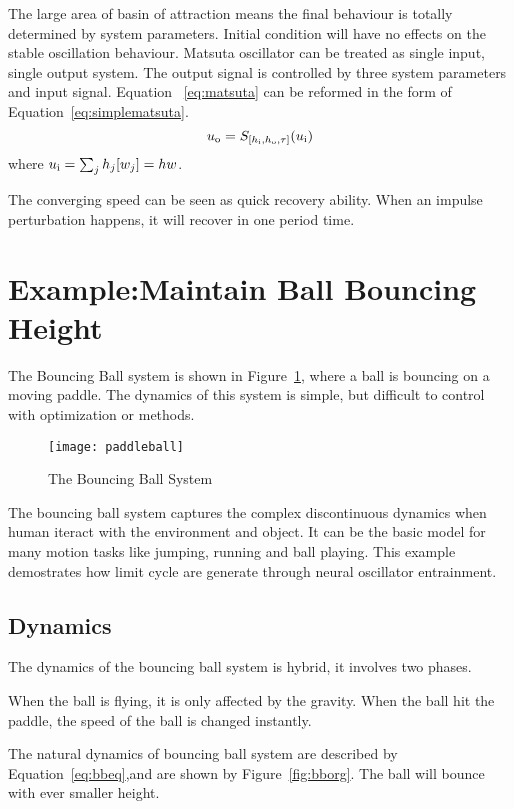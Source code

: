 The large area of basin of attraction means the final behaviour is totally determined by system parameters. 
Initial condition will have no effects on the stable oscillation behaviour. 
Matsuta oscillator can be treated as single input, single output system.
The output signal is controlled by three system parameters and input signal. 
Equation ~\ref{eq:matsuta} can be reformed in the form of Equation~\ref{eq:simplematsuta}.
\begin{equation}
\label{eq:simplematsuta}
u_{\mathrm{o}}=S_{[h_{\mathrm{i}},h_{\mathrm{o}},\tau]}(u_{\mathrm{i}})
\end{equation}
where $u_{\mathrm{i}}=\sum_{j}h_{j}[w_{j}]=hw$.





The converging speed can be seen as quick recovery ability.
When an impulse perturbation happens, it will recover in one period time.


\section{Example:Maintain Ball Bouncing Height}
\label{sec:qualyexample}
The Bouncing Ball system is shown in Figure~\ref{fig:bball}, where a ball is bouncing on a moving paddle.
The dynamics of this system is simple, but difficult to control with optimization or \pd methods.
\begin{figure}
\begin{center}
\texttt{[image: paddleball]}
\end{center}
\caption{The Bouncing Ball System}
\label{fig:bball}
\end{figure}
 
The bouncing ball system captures the complex discontinuous dynamics when human iteract with the environment and object. 
It can be the basic model for many motion tasks like jumping, running and ball playing.
This example demostrates how limit cycle are generate through neural  oscillator entrainment.
 
\subsection*{Dynamics}
The dynamics of the bouncing ball system is hybrid, it involves two phases.
\begin{itemize}
When the ball is flying, it is only affected by the gravity.
When the ball hit the paddle, the speed of the ball is changed instantly.
\end{itemize}
The natural dynamics of bouncing ball system are described by  Equation~\ref{eq:bbeq},and are shown by Figure~\ref{fig:bborg}. 
The ball will  bounce with ever smaller height. 


